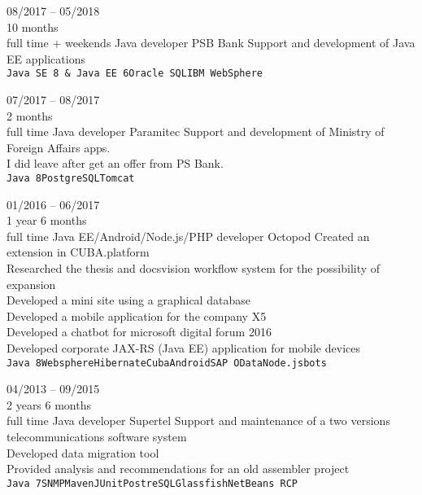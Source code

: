 \begin{entrylist}
    \entry
    {08/2017 -- 05/2018\\\footnotesize{10 months\\full time + weekends}}
    {Java developer}
    {PSB Bank}
    {
        Support and development of Java EE applications \\
        \texttt{Java SE 8 \& Java EE 6}\slashsep\texttt{Oracle SQL}\slashsep\texttt{IBM WebSphere}
    }
    
    \entry
    {07/2017 -- 08/2017\\\footnotesize{2 months\\full time}}
    {Java developer}
    {Paramitec}
    {
        Support and development of Ministry of Foreign Affairs apps. \\
        I did leave after get an offer from PS Bank. \\
        \texttt{Java 8}\slashsep\texttt{PostgreSQL}\slashsep\texttt{Tomcat}
    }
    
    \entry
    {01/2016 -- 06/2017\\\footnotesize{1 year 6 months\\full time}}
    {Java EE/Android/Node.js/PHP developer}
    {Octopod}
    {
        Created an extension in CUBA.platform \\
        Researched the thesis and docsvision workflow system for the possibility of expansion \\
        Developed a mini site using a graphical database \\
        Developed a mobile application for the company X5 \\
        Developed a chatbot for microsoft digital forum 2016 \\
        Developed corporate JAX-RS (Java EE) application for mobile devices\\
    \texttt{Java 8}\slashsep\texttt{Websphere}\slashsep\texttt{Hibernate}\slashsep\texttt{Cuba}\slashsep\texttt{Android}\slashsep\texttt{SAP OData}\slashsep\texttt{Node.js}\slashsep\texttt{bots}
	}
    
    \entry
    {04/2013 -- 09/2015\\\footnotesize{2 years 6 months\\full time}}
    {Java developer}
    {Supertel}
    {
        Support and maintenance of a two versions telecommunications software system \\
        Developed data migration tool \\
        Provided analysis and recommendations for an old assembler project \\
        \texttt{Java 7}\slashsep\texttt{SNMP}\slashsep\texttt{Maven}\slashsep\texttt{JUnit}\slashsep\texttt{PostreSQL}\slashsep\texttt{Glassfish}\slashsep\texttt{NetBeans RCP}
    }


\end{entrylist}
